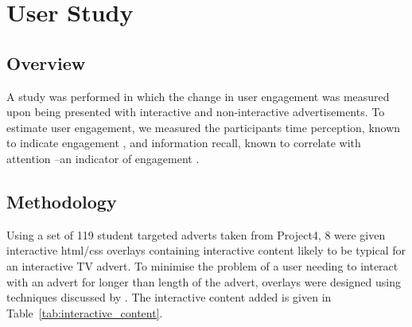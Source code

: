\section{User Study}
	\label{sec:user_study}
	\subsection{Overview}
	A study was performed in which the change in user engagement was measured upon being presented with interactive and non-interactive advertisements. To estimate user engagement, we measured the participants time perception, known to indicate engagement \citep{yahoo-intrusive-advertising}, and information recall, known to correlate with attention \citep{interactions_attention_memory}--an indicator of engagement \cite{what_is_engagement}.

	\subsection{Methodology}
	Using a set of 119 student targeted adverts taken from Project4, 8 were given interactive html/css overlays containing interactive content likely to be typical for an interactive TV advert. To minimise the problem of a user needing to interact with an advert for longer than length of the advert, overlays were designed using techniques discussed by \citet{integrated-approach-advertising}. The interactive content added is given in Table~\ref{tab:interactive_content}.

